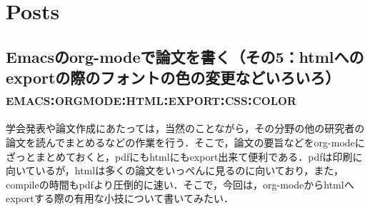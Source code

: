 \documentclass[autodetect-engine,dvipdfmx,12pt,a4paper,ja=standard]{bxjsarticle}
\author{細田弘吉}
\date{\today}
\title{}
\begin{document}
\tableofcontents

\section{Posts}
\label{sec:org713ac34}
\subsection{Emacsのorg-modeで論文を書く（その5：htmlへのexportの際のフォントの色の変更などいろいろ）\hfill{}\textsc{emacs:orgmode:html:export:css:color}}
\label{sec:org31add9a}
学会発表や論文作成にあたっては，当然のことながら，その分野の他の研究者の論文を読んでまとめるなどの作業を行う．そこで，論文の要旨などをorg-modeにざっとまとめておくと，pdfにもhtmlにもexport出来て便利である．pdfは印刷に向いているが，htmlは多くの論文をいっぺんに見るのに向いており，また，compileの時間もpdfより圧倒的に速い．そこで，今回は，org-modeからhtmlへexportする際の有用な小技について書いてみたい．
\end{document}
